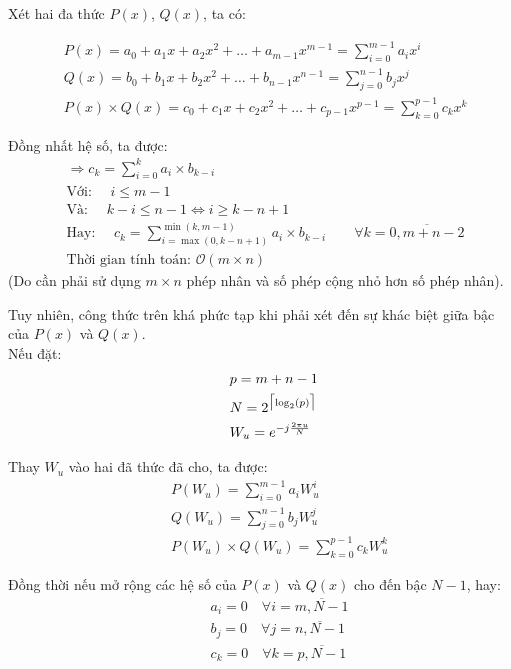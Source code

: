 \documentclass[../report.tex]{subfiles}
\begin{document}
Xét hai đa thức $P(x)$, $Q(x)$, ta có: 

\begin{align*}
    &P(x) = a_0 + a_1 x + a_2 x^2 + \dots + a_{m - 1} x^{m - 1} = 
    \sum_{i = 0}^{m - 1} a_i x ^ i \\
    &Q(x) = b_0 + b_1 x + b_2 x^2 + \dots + b_{n - 1} x^{n - 1} = 
    \sum_{j = 0}^{n - 1} b_j x^j \\
    &P(x) \times Q(x) = c_0 + c_1 x + c_2 x^2 + \dots 
    + c_{p - 1} x^{p - 1} =
    \sum_{k = 0}^{p - 1} c_k x^k 
\end{align*}

\noindent Đồng nhất hệ số, ta được: 
\begin{align*}
    &\Rightarrow c_k = \sum_{i = 0} ^ {k} a_i \times b_{k - i} \\
    &\textrm{Với: } \quad i \le m - 1 \\
    &\textrm{Và: } \quad k - i \le n - 1 \Leftrightarrow i \ge k - n + 1\\
    &\textrm{Hay: } \quad 
    c_k = \sum_{i = \max(0, k - n + 1)} ^ {\min(k, m - 1)} 
    a_i \times b_{k - i} 
    \quad\quad\forall k = \overline{0, m + n - 2} \\
    &\textrm{Thời gian tính toán: } \mathcal{O}\left(m \times n\right)
\end{align*}
(Do cần phải sử dụng $m \times n$ phép nhân và số phép cộng nhỏ 
hơn số phép nhân).

\noindent Tuy nhiên, công thức trên khá phức tạp khi phải xét đến sự 
khác biệt giữa bậc của $P(x)$ và $Q(x)$. \\
Nếu đặt: 
\begin{align*}
    &\quad\quad p = m + n - 1 \\
    &\quad\quad N = 2^{\ceil[\big]{\log_2 (p)}} \\
    &\quad\quad W_u = e ^ {-j\frac{2 \pi u}{N}}
\end{align*}

\noindent Thay $W_u$ vào hai đã thức đã cho, ta được:
\begin{align*}
    &\quad\quad P(W_u) = \sum_{i = 0}^{m - 1} a_i W_u^i \\
    &\quad\quad Q(W_u) = \sum_{j = 0}^{n - 1} b_j W_u^j \\
    &\quad\quad P(W_u) \times Q(W_u) = \sum_{k = 0}^{p - 1} c_k W_u^k
\end{align*}

\noindent Đồng thời nếu mở rộng các hệ số của $P(x)$ 
và $Q(x)$ cho đến bậc $N - 1$, hay: 
\begin{align*}
    &\quad\quad a_i = 0 \quad \forall i = \overline{m, N - 1} \\
    &\quad\quad b_j = 0 \quad \forall j = \overline{n, N - 1} \\
    &\quad\quad c_k = 0 \quad \forall k = \overline{p, N - 1} \\
\end{align*}
\end{document}
